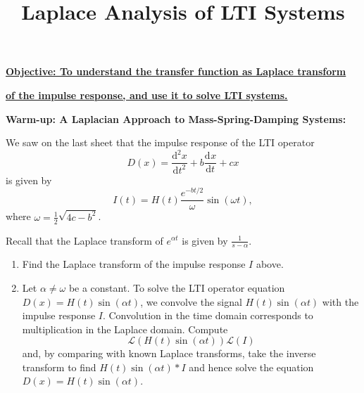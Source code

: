 \documentclass{article}
\newcommand{\deriv}[3][]{\frac{\mathrm{d}^{#1}#2}{\mathrm{d}#3^{#1}}}
\begin{document}
\title{Laplace Analysis of LTI Systems}
\date{}

\maketitle
\thispagestyle{empty}

\Large

\vskip -10mm

\textbf{\underline{Objective: To understand the transfer function as Laplace transform}}

\textbf{\underline{of the impulse response, and use it to solve LTI systems.}}






\vspace{5mm}












\textbf{Warm-up: A Laplacian Approach to Mass-Spring-Damping Systems:}

\bigskip


We saw on the last sheet that the impulse response of the LTI operator
\[D(x)=\deriv[2]{x}{t}+b\deriv{x}{t}+cx\]
is given by
\[I(t)=H(t)\frac{e^{-bt/2}}{\omega}\sin(\omega t),\]
where $\omega = \frac{1}{2}\sqrt{4c-b^2}$.

Recall that the Laplace transform of $e^{\alpha t}$ is given by $\frac{1}{s-\alpha}$.

\begin{enumerate}
	\item Find the Laplace transform of the impulse response $I$ above.
	\item Let $\alpha\neq \omega$ be a constant. To solve the LTI operator equation $D(x)=H(t)\sin(\alpha t)$, we convolve the signal $H(t)\sin(\alpha t)$ with the impulse response $I$. Convolution in the time domain corresponds to multiplication in the Laplace domain. Compute
		\[\mathcal{L}(H(t)\sin(\alpha t))\mathcal{L}(I)\]
		and, by comparing with known Laplace transforms, take the inverse transform to find $H(t)\sin(\alpha t)\ast I$ and hence solve the equation $D(x)=H(t)\sin(\alpha t)$.
\end{enumerate}



\clearpage
\end{document}
